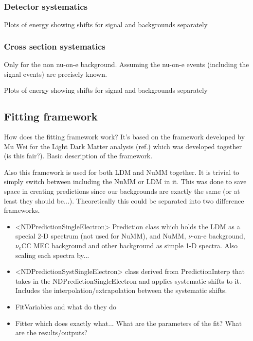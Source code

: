 \documentclass[12pt]{article}
\begin{document}
\subsubsection*{Detector systematics}
Plots of energy showing shifts for signal and backgrounds separately

\subsubsection*{Cross section systematics}
Only for the non nu-on-e background. Assuming the nu-on-e events (including the signal events) are precisely known.

Plots of energy showing shifts for signal and backgrounds separately

\subsection{Fitting framework}
How does the fitting framework work? It's based on the framework developed by Mu Wei for the Light Dark Matter analysis (ref.) which was developed together (is this fair?). Basic description of the framework.

Also this framework is used for both LDM and NuMM together. It is trivial to simply switch between including the NuMM or LDM in it. This was done to save space in creating predictions since our backgrounds are exactly the same (or at least they should be...). Theoretically this could be separated into two difference frameworks.

\begin{itemize}
\item <NDPredictionSingleElectron> Prediction class which holds the LDM as a special 2-D spectrum (not used for NuMM), and NuMM, $\nu$-on-e background, $\nu_e$CC MEC background and other background as simple 1-D spectra. Also scaling each spectra by...
\item <NDPredictionSystSingleElectron> class derived from PredictionInterp that takes in the NDPredictionSingleElectron and applies systematic shifts to it. Includes the interpolation/extrapolation between the systematic shifts.
\item FitVariables and what do they do
\item Fitter which does exactly what... What are the parameters of the fit? What are the results/outputs?
\end{itemize}

\end{document}
